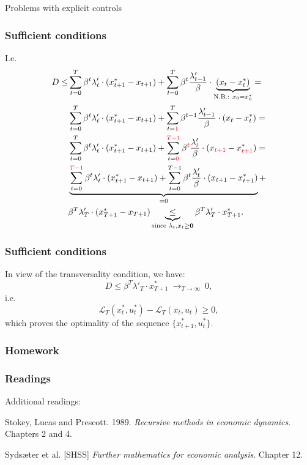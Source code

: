 \documentclass[10pt]{beamer}
\theoremstyle{definition}
\begin{document}
\begin{section}{Problems with explicit controls}
\begin{frame}[fragile]
\frametitle{Sufficient conditions}
I.e. \begin{equation*}
\begin{split}
 D \leq &   \sum_{t=0}^{T}\beta^t \lambda'_t \cdot (x^*_{t+1} - x_{t+1} ) +  \sum_{t=0}^{T}\beta^t \frac{\lambda'_{t-1}}{\beta}\cdot\underbrace{(x_t-x_t^*)}_{\text{N.B.: } x_0 = x^*_0} = \\
&  \sum_{t=0}^{T}\beta^t \lambda'_t \cdot (x^*_{t+1} - x_{t+1} ) +  \sum_{t = {\color{red}1}}^{T}\beta^{t-1} \frac{\lambda'_{t-1}}{\beta}\cdot(x_t-x_t^*)= \\
&  \sum_{t=0}^{T}\beta^t \lambda'_t \cdot (x^*_{t+1} - x_{t+1} ) +  \sum_{t = {\color{red} 0}}^{{\color{red} T-1}}\beta^{{\color{red} t}} \frac{\lambda'_{{\color{red} t}}}{\beta}\cdot(x_{{\color{red} t+1}}-x_{{\color{red} t+1}}^*)= \\
& \underbrace{\sum_{t=0}^{{\color{red} T-1}}\beta^t \lambda'_t \cdot (x^*_{t+1} - x_{t+1}) +  \sum_{t = 0}^{T-1}\beta^{t} \frac{\lambda'_{t}}{\beta}\cdot(x_{ t+1}-x_{t+1}^*)}_{=0} + \\
& \beta^T \lambda'_T \cdot (x^*_{T+1} - x_{T+1})  \underbrace{\leq}_{\text{since }\lambda_t,x_t \geq \mathbf{0}} \beta^T \lambda'_T \cdot x^*_{T+1}.
\end{split}
\end{equation*}
\end{frame}


\begin{frame}[fragile]
\frametitle{Sufficient conditions}
In view of the transversality condition, we have: \begin{equation*}
 D \leq  \beta^T \lambda'_T \cdot x^*_{T+1} ~ \mathop{\longrightarrow}_{T \rightarrow \infty} ~0 ,
\end{equation*}
i.e. 
\[  \mathcal{L}_T(x^*_t,u^*_t) - \mathcal{L}_T (x_t,u_t) \geq 0, \] which proves the optimality of the sequence
$\{x^*_{t+1},u^*_t\}$.
\end{frame}
\end{section}

\begin{frame}[fragile]
\frametitle{Homework}
\framesubtitle{}

\end{frame}


\begin{frame}[fragile]
\frametitle{Readings}
Additional readings:\bigskip

Stokey, Lucas and Prescott. 1989. \emph{Recursive methods in economic dynamics}. Chapters 2 and 4.\bigskip

Syds\ae{}ter et al. [SHSS] \emph{Further mathematics for economic analysis}. Chapter 12.\bigskip
\end{frame}
\end{document}
